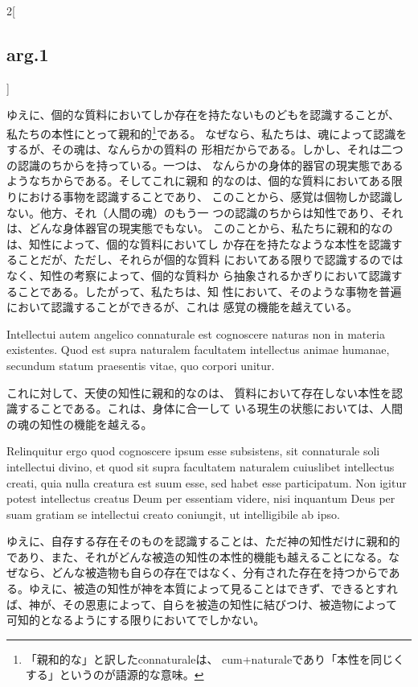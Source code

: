 \documentclass[paper=a4paper,fontsize=10pt,jafontsize=9pt,titlepage]{jlreq}
\begin{document}
\begin{paracol}{2}[\subsection{arg.1}]
\switchcolumn

ゆえに、個的な質料においてしか存在を持たないものどもを認識することが、
私たちの本性にとって親和的\footnote{「親和的な」と訳したconnaturaleは、
cum+naturaleであり「本性を同じくする」というのが語源的な意味。}である。
なぜなら、私たちは、魂によって認識をするが、その魂は、なんらかの質料の
形相だからである。しかし、それは二つの認識のちからを持っている。一つは、
なんらかの身体的器官の現実態であるようなちからである。そしてこれに親和
的なのは、個的な質料においてある限りにおける事物を認識することであり、
このことから、感覚は個物しか認識しない。他方、それ（人間の魂）のもう一
つの認識のちからは知性であり、それは、どんな身体器官の現実態でもない。
このことから、私たちに親和的なのは、知性によって、個的な質料においてし
か存在を持たなような本性を認識することだが、ただし、それらが個的な質料
においてある限りで認識するのではなく、知性の考察によって、個的な質料か
ら抽象されるかぎりにおいて認識することである。したがって、私たちは、知
性において、そのような事物を普遍において認識することができるが、これは
感覚の機能を越えている。

\switchcolumn*

Intellectui autem angelico
connaturale est cognoscere naturas non in materia existentes. Quod est
supra naturalem facultatem intellectus animae humanae, secundum statum
praesentis vitae, quo corpori unitur.

\switchcolumn

これに対して、天使の知性に親和的なのは、
質料において存在しない本性を認識することである。これは、身体に合一して
いる現生の状態においては、人間の魂の知性の機能を越える。

\switchcolumn*

Relinquitur ergo quod cognoscere ipsum esse subsistens, sit
connaturale soli intellectui divino, et quod sit supra facultatem
naturalem cuiuslibet intellectus creati, quia nulla creatura est suum
esse, sed habet esse participatum. Non igitur potest intellectus
creatus Deum per essentiam videre, nisi inquantum Deus per suam
gratiam se intellectui creato coniungit, ut intelligibile ab ipso.

\switchcolumn

ゆえに、自存する存在そのものを認識することは、ただ神の知性だけに親和的
であり、また、それがどんな被造の知性の本性的機能も越えることになる。な
ぜなら、どんな被造物も自らの存在ではなく、分有された存在を持つからであ
る。ゆえに、被造の知性が神を本質によって見ることはできず、できるとすれ
ば、神が、その恩恵によって、自らを被造の知性に結びつけ、被造物によって
可知的となるようにする限りにおいてでしかない。


\end{paracol}
\end{document}
